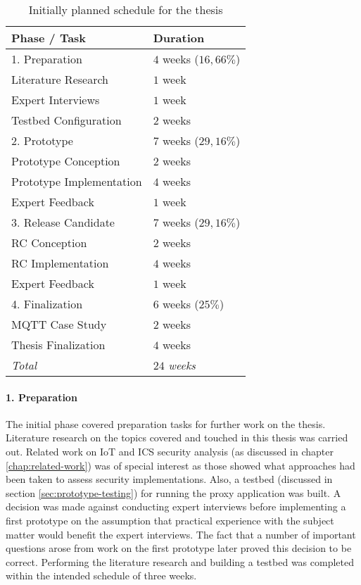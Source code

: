 \begin{table}
    \centering
    \begin{tabular}{l l}
        \toprule
        Phase / Task             & Duration              \\
        \midrule
        1. Preparation           & $4$ weeks ($16,66\%$) \\
        \midrule
        Literature Research      & $1$ week              \\
        Expert Interviews        & $1$ week              \\
        Testbed Configuration    & $2$ weeks             \\
        \midrule
        2. Prototype             & $7$ weeks ($29,16\%$) \\
        \midrule
        Prototype Conception     & $2$ weeks             \\
        Prototype Implementation & $4$ weeks             \\
        Expert Feedback          & $1$ week              \\
        \midrule
        3. Release Candidate     & $7$ weeks ($29,16\%$) \\
        \midrule
        RC Conception            & $2$ weeks             \\
        RC Implementation        & $4$ weeks             \\
        Expert Feedback          & $1$ week              \\
        \midrule
        4. Finalization          & $6$ weeks ($25\%$)    \\
        \midrule
        MQTT Case Study          & $2$ weeks             \\
        Thesis Finalization      & $4$ weeks             \\
        \midrule
        \midrule
        \emph{Total}             & \emph{$24$ weeks}     \\
        \bottomrule
    \end{tabular}
    \caption{Initially planned schedule for the thesis}
    \label{fig:thesis-schedule}
\end{table}

\paragraph{1. Preparation} The initial phase covered preparation tasks for further work on the thesis. Literature research on the topics covered and touched in this thesis was carried out. Related work on \ac{IoT} and \ac{ICS} security analysis (as discussed in chapter \ref{chap:related-work}) was of special interest as those showed what approaches had been taken to assess security implementations. Also, a testbed (discussed in section \ref{sec:prototype-testing}) for running the proxy application was built. A decision was made against conducting expert interviews before implementing a first prototype on the assumption that practical experience with the subject matter would benefit the expert interviews. The fact that a number of important questions arose from work on the first prototype later proved this decision to be correct. Performing the literature research and building a testbed was completed within the intended schedule of three weeks.
